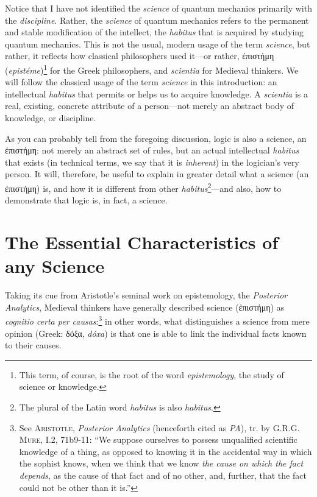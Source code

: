 \documentclass[
  12pt,
]{memoir}
\begin{document}
Notice that I have not identified the \emph{science} of quantum
mechanics primarily with the \emph{discipline}. Rather, the
\emph{science} of quantum mechanics refers to the permanent and stable
modification of the intellect, the \emph{habitus} that is acquired by
studying quantum mechanics. This is not the usual, modern usage of the
term \emph{science}, but rather, it reflects how classical philosophers
used it---or rather, ἐπιστήμη (\emph{epistéme})\footnote{This term, of
  course, is the root of the word \emph{epistemology}, the study of
  science or knowledge.} for the Greek philosophers, and \emph{scientia}
for Medieval thinkers. We will follow the classical usage of the term
\emph{science} in this introduction: an intellectual \emph{habitus} that
permits or helps us to acquire knowledge. A \emph{scientia} is a real,
existing, concrete attribute of a person---not merely an abstract body
of knowledge, or discipline.

As you can probably tell from the foregoing discussion, logic is also a
science, an ἐπιστήμη: not merely an abstract set of rules, but an actual
intellectual \emph{habitus} that exists (in technical terms, we say that
it is \emph{inherent}) in the logician's very person. It will,
therefore, be useful to explain in greater detail what a science (an
ἐπιστήμη) is, and how it is different from other
\emph{habitus}\footnote{The plural of the Latin word \emph{habitus} is
  also \emph{habitus}.}---and also, how to demonstrate that logic is, in
fact, a science.

\section{The Essential Characteristics of any
Science}\label{the-essential-characteristics-of-any-science}

Taking its cue from Aristotle's seminal work on epistemology, the
\emph{Posterior Analytics}, Medieval thinkers have generally described
science (ἐπιστήμη) as \emph{cognitio certa per causas}:\footnote{See
  \textsc{Aristotle}, \emph{Posterior Analytics} (henceforth cited as
  \emph{PA}), tr. by \textsc{G.R.G. Mure}, I.2, 71b9-11: ``We suppose
  ourselves to possess unqualified scientific knowledge of a thing, as
  opposed to knowing it in the accidental way in which the sophist
  knows, when we think that we know \emph{the cause on which the fact
  depends}, as the cause of that fact and of no other, and, further,
  that the fact could not be other than it is.''} in other words, what
distinguishes a science from mere opinion (Greek: δόξα, \emph{dóxa}) is
that one is able to link the individual facts known to their causes.
\end{document}
